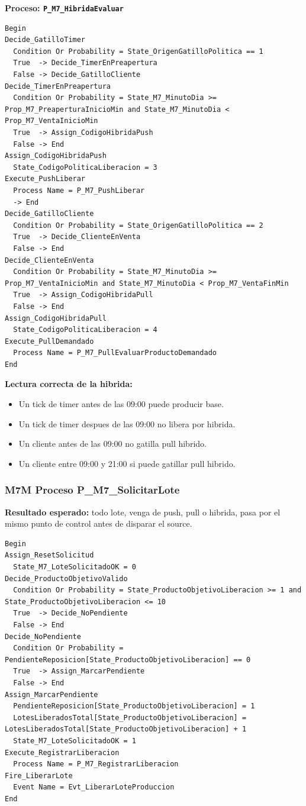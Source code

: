 \documentclass[11pt]{article}
\newcommand{\proc}[1]{\texttt{#1}}
\begin{document}
\textbf{Proceso: \proc{P\_M7\_HibridaEvaluar}}

\begin{lstlisting}[caption={Bloques de P M7 HibridaEvaluar}]
Begin
Decide_GatilloTimer
  Condition Or Probability = State_OrigenGatilloPolitica == 1
  True  -> Decide_TimerEnPreapertura
  False -> Decide_GatilloCliente
Decide_TimerEnPreapertura
  Condition Or Probability = State_M7_MinutoDia >= Prop_M7_PreaperturaInicioMin and State_M7_MinutoDia < Prop_M7_VentaInicioMin
  True  -> Assign_CodigoHibridaPush
  False -> End
Assign_CodigoHibridaPush
  State_CodigoPoliticaLiberacion = 3
Execute_PushLiberar
  Process Name = P_M7_PushLiberar
  -> End
Decide_GatilloCliente
  Condition Or Probability = State_OrigenGatilloPolitica == 2
  True  -> Decide_ClienteEnVenta
  False -> End
Decide_ClienteEnVenta
  Condition Or Probability = State_M7_MinutoDia >= Prop_M7_VentaInicioMin and State_M7_MinutoDia < Prop_M7_VentaFinMin
  True  -> Assign_CodigoHibridaPull
  False -> End
Assign_CodigoHibridaPull
  State_CodigoPoliticaLiberacion = 4
Execute_PullDemandado
  Process Name = P_M7_PullEvaluarProductoDemandado
End
\end{lstlisting}

\textbf{Lectura correcta de la hibrida:}
\begin{itemize}
  \item Un tick de timer antes de las 09:00 puede producir base.
  \item Un tick de timer despues de las 09:00 no libera por hibrida.
  \item Un cliente antes de las 09:00 no gatilla pull hibrido.
  \item Un cliente entre 09:00 y 21:00 si puede gatillar pull hibrido.
\end{itemize}

\subsubsection{M7M Proceso P\_M7\_SolicitarLote}
\textbf{Resultado esperado:} todo lote, venga de push, pull o hibrida, pasa por el mismo punto de control antes de disparar el source.

\begin{lstlisting}[caption={Bloques de P M7 SolicitarLote}]
Begin
Assign_ResetSolicitud
  State_M7_LoteSolicitadoOK = 0
Decide_ProductoObjetivoValido
  Condition Or Probability = State_ProductoObjetivoLiberacion >= 1 and State_ProductoObjetivoLiberacion <= 10
  True  -> Decide_NoPendiente
  False -> End
Decide_NoPendiente
  Condition Or Probability = PendienteReposicion[State_ProductoObjetivoLiberacion] == 0
  True  -> Assign_MarcarPendiente
  False -> End
Assign_MarcarPendiente
  PendienteReposicion[State_ProductoObjetivoLiberacion] = 1
  LotesLiberadosTotal[State_ProductoObjetivoLiberacion] = LotesLiberadosTotal[State_ProductoObjetivoLiberacion] + 1
  State_M7_LoteSolicitadoOK = 1
Execute_RegistrarLiberacion
  Process Name = P_M7_RegistrarLiberacion
Fire_LiberarLote
  Event Name = Evt_LiberarLoteProduccion
End
\end{lstlisting}
\end{document}
